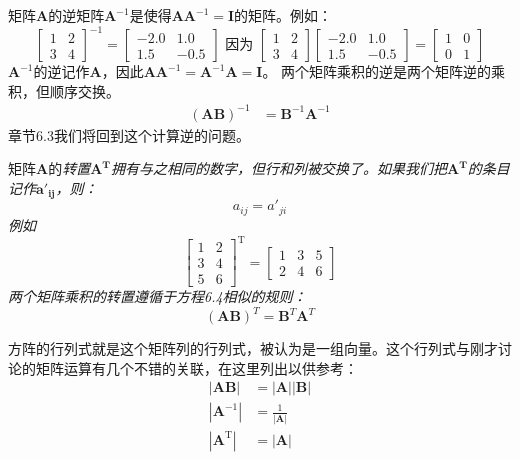 \documentclass[lang=cn,12pt]{elegantbook}
\begin{document}
矩阵$\mathbf{A}$的逆矩阵$\mathbf{A}^{-1}$是使得$\mathbf{A}\mathbf{A}^{-1} = \mathbf{I}$的矩阵。例如：
$$
\left[\begin{array}{ll}
1 & 2 \\
3 & 4
\end{array}\right]^{-1}=\left[\begin{array}{rr}
-2.0 & 1.0 \\
1.5 & -0.5
\end{array}\right] \text { 因为 }\left[\begin{array}{ll}
1 & 2 \\
3 & 4
\end{array}\right]\left[\begin{array}{rr}
-2.0 & 1.0 \\
1.5 & -0.5
\end{array}\right]=\left[\begin{array}{ll}
1 & 0 \\
0 & 1
\end{array}\right]
$$
$\mathbf{A}^{-1}$的逆记作$\mathbf{A}$，因此$\mathbf{AA}^{-1} = \mathbf{A}^{-1}\mathbf{A} = \mathbf{I}$。
两个矩阵乘积的逆是两个矩阵逆的乘积，但顺序交换。
\begin{align}
(\mathbf{A B})^{-1} & = \mathbf{B}^{-1} \mathbf{A}^{-1}
\end{align}
章节6.3我们将回到这个计算逆的问题。

矩阵$\mathbf{A}$的\it{转置}$\mathbf{A^T}$拥有与之相同的数字，但行和列被交换了。如果我们把$\mathbf{A^T}$的条目记作$\mathbf{a'_{ij}}$，则：$$a_{ij} = a'_{ji}$$例如
$$
\left[\begin{array}{ll}
1 & 2 \\
3 & 4 \\
5 & 6
\end{array}\right]^{\mathrm{T}}=\left[\begin{array}{lll}
1 & 3 & 5 \\
2 & 4 & 6
\end{array}\right]
$$
两个矩阵乘积的转置遵循于方程6.4相似的规则：$$(\mathbf{AB})^T=\mathbf{B}^T\mathbf{A}^T$$

方阵的行列式就是这个矩阵列的行列式，被认为是一组向量。这个行列式与刚才讨论的矩阵运算有几个不错的关联，在这里列出以供参考：
\begin{align}
|\mathbf{A B}| & = |\mathbf{A}| |\mathbf{B}| \\
\left|\mathbf{A}^{-1}\right| & = \frac{1}{|\mathbf{A}|} \\
\left|\mathbf{A}^{\mathrm{T}}\right| & = |\mathbf{A}| 
\end{align}
\end{document}
